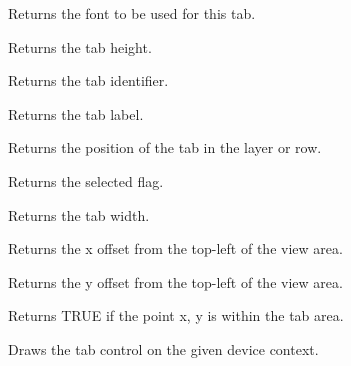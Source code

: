 

Returns the font to be used for this tab.



Returns the tab height.



Returns the tab identifier.



Returns the tab label.



Returns the position of the tab in the layer or row.



Returns the selected flag.



Returns the tab width.



Returns the x offset from the top-left of the view area.



Returns the y offset from the top-left of the view area.



Returns TRUE if the point x, y is within the tab area.



Draws the tab control on the given device context.

